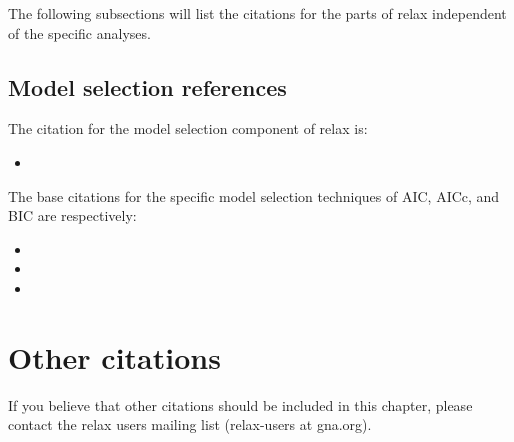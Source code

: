 The following subsections will list the citations for the parts of relax independent of the specific analyses.



\subsection*{Model selection references}

The citation for the model selection component of relax is:

\begin{itemize}
\item {}
\end{itemize}

The base citations for the specific model selection techniques of AIC, AICc, and BIC are respectively:

\begin{itemize}
\item {}
\item {}
\item {}
\end{itemize}




\section*{Other citations}

If you believe that other citations should be included in this chapter, please contact the relax users mailing list (relax-users at gna.org).
